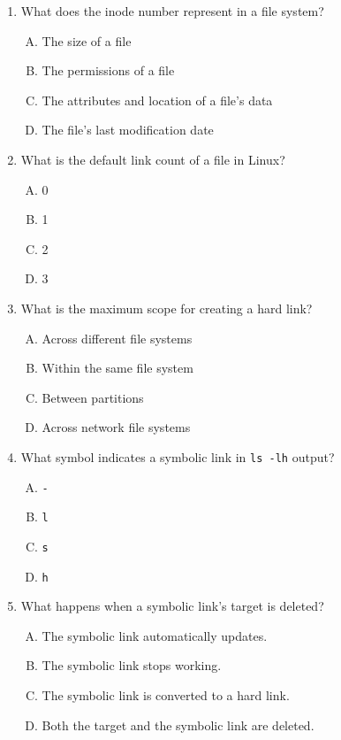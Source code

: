 \documentclass[a4paper]{report}
\begin{document}
\begin{enumerate}[1.]
    \item What does the inode number represent in a file system?  
    \begin{enumerate}[A)]
        \item The size of a file  
        \item The permissions of a file  
        \item The attributes and location of a file's data  
        \item The file's last modification date  
    \end{enumerate}

    \item What is the default link count of a file in Linux?  
    \begin{enumerate}[A)]
        \item 0  
        \item 1  
        \item 2  
        \item 3  
    \end{enumerate}

    \item What is the maximum scope for creating a hard link?  
    \begin{enumerate}[A)]
        \item Across different file systems  
        \item Within the same file system  
        \item Between partitions  
        \item Across network file systems  
    \end{enumerate}

    \item What symbol indicates a symbolic link in \texttt{ls -lh} output?  
    \begin{enumerate}[A)]
        \item \texttt{-}  
        \item \texttt{l}  
        \item \texttt{s}  
        \item \texttt{h}  
    \end{enumerate}

    \item What happens when a symbolic link’s target is deleted?  
    \begin{enumerate}[A)]
        \item The symbolic link automatically updates.  
        \item The symbolic link stops working.  
        \item The symbolic link is converted to a hard link.  
        \item Both the target and the symbolic link are deleted.  
    \end{enumerate}


\end{enumerate}
\end{document}
